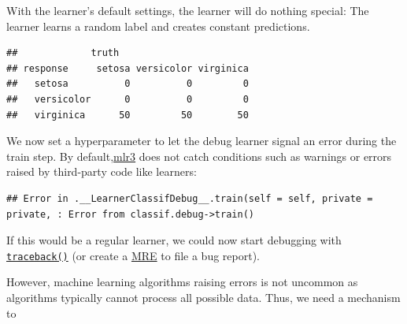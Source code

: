 \documentclass[
]{scrbook}
\newenvironment{Shaded}{\begin{snugshade}}{\end{snugshade}}
\newcommand{\AttributeTok}[1]{\textcolor[rgb]{0.77,0.63,0.00}{#1}}
\newcommand{\DecValTok}[1]{\textcolor[rgb]{0.00,0.00,0.81}{#1}}
\newcommand{\FunctionTok}[1]{\textcolor[rgb]{0.00,0.00,0.00}{#1}}
\newcommand{\NormalTok}[1]{#1}
\newcommand{\OtherTok}[1]{\textcolor[rgb]{0.56,0.35,0.01}{#1}}
\newcommand{\SpecialCharTok}[1]{\textcolor[rgb]{0.00,0.00,0.00}{#1}}
\newcommand{\StringTok}[1]{\textcolor[rgb]{0.31,0.60,0.02}{#1}}
\renewenvironment{Shaded} {\begin{snugshade}\small} {\end{snugshade}}
\begin{document}
With the learner's default settings, the learner will do nothing special: The learner learns a random label and creates constant predictions.

\begin{Shaded}
\end{Shaded}

\begin{verbatim}
##             truth
## response     setosa versicolor virginica
##   setosa          0          0         0
##   versicolor      0          0         0
##   virginica      50         50        50
\end{verbatim}

We now set a hyperparameter to let the debug learner signal an error during the train step.
By default,\href{https://github.com/mlr-org/mlr3}{mlr3} does not catch conditions such as warnings or errors raised by third-party code like learners:

\begin{Shaded}
\end{Shaded}

\begin{verbatim}
## Error in .__LearnerClassifDebug__.train(self = self, private = private, : Error from classif.debug->train()
\end{verbatim}

If this would be a regular learner, we could now start debugging with \href{https://www.rdocumentation.org/packages/base/topics/traceback}{\texttt{traceback()}} (or create a \href{https://stackoverflow.com/help/minimal-reproducible-example}{MRE} to file a bug report).

However, machine learning algorithms raising errors is not uncommon as algorithms typically cannot process all possible data.
Thus, we need a mechanism to
\end{document}
